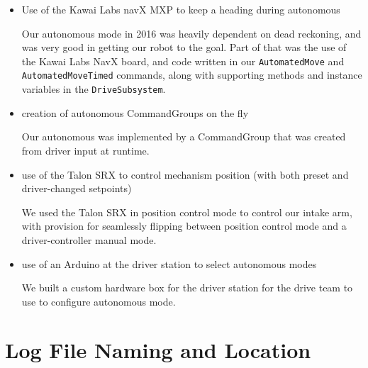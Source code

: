\documentclass[]{article}
\begin{document}
\begin{itemize}[topsep=0pt]
We used this data in 2015 to determine if it was possible to lose weight by changing to a smaller air compressor.
We logged the current drawn by the compressor, and by looking at the plot of current draw, we were able to determine exactly how much the compressor was run during any given match. See Figure~\ref{fig:plot}.

\begin{figure}[h]
\begin{mdframed}
\texttt{[image: Plots3.pdf]}
\caption{Veusz plot of compressor current data}
\label{fig:plot}
\end{mdframed}
\end{figure}

\item Use of the Kawai Labs navX MXP to keep a heading during autonomous

Our autonomous mode in 2016 was heavily dependent on dead reckoning, and was very good in getting our robot to the goal. Part of that was the use of the Kawai Labs NavX board, and code written in our \texttt{AutomatedMove} and \texttt{AutomatedMoveTimed} commands, along with supporting methods and instance variables in the \texttt{DriveSubsystem}.

\item creation of autonomous CommandGroups on the fly

Our autonomous was implemented by a CommandGroup that was created from driver input at runtime.

\item use of the Talon SRX to control mechanism position (with both preset and driver-changed setpoints)

We used the Talon SRX in position control mode to control our intake arm, with provision for seamlessly flipping between position control mode and a driver-controller manual mode.

\item use of an Arduino at the driver station to select autonomous modes

We built a custom hardware box for the driver station for the drive team to use to configure autonomous mode.

\end{itemize}

\section {Log File Naming and Location}
\end{document}
